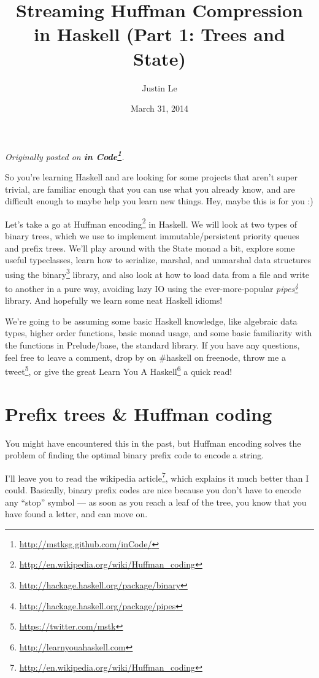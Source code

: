 \documentclass[]{article}
\title{Streaming Huffman Compression in Haskell (Part 1: Trees and State)}
\author{Justin Le}
\date{March 31, 2014}
\renewcommand{\href}[2]{#2\footnote{\url{#1}}}
\begin{document}
\maketitle

\emph{Originally posted on
\textbf{\href{http://mstksg.github.com/inCode/}{in Code}}.}

So you're learning Haskell and are looking for some projects that aren't
super trivial, are familiar enough that you can use what you already
know, and are difficult enough to maybe help you learn new things. Hey,
maybe this is for you :)

Let's take a go at
\href{http://en.wikipedia.org/wiki/Huffman_coding}{Huffman encoding} in
Haskell. We will look at two types of binary trees, which we use to
implement immutable/persistent priority queues and prefix trees. We'll
play around with the State monad a bit, explore some useful typeclasses,
learn how to serialize, marshal, and unmarshal data structures using the
\href{http://hackage.haskell.org/package/binary}{binary} library, and
also look at how to load data from a file and write to another in a pure
way, avoiding lazy IO using the ever-more-popular
\emph{\href{http://hackage.haskell.org/package/pipes}{pipes}} library.
And hopefully we learn some neat Haskell idioms!

We're going to be assuming some basic Haskell knowledge, like algebraic
data types, higher order functions, basic monad usage, and some basic
familiarity with the functions in Prelude/base, the standard library. If
you have any questions, feel free to leave a comment, drop by on
\#haskell on freenode, throw me a
\href{https://twitter.com/mstk}{tweet}, or give the great
\href{http://learnyouahaskell.com}{Learn You A Haskell} a quick read!

\section{Prefix trees \& Huffman
coding}\label{prefix-trees-huffman-coding}

You might have encountered this in the past, but Huffman encoding solves
the problem of finding the optimal binary prefix code to encode a
string.

I'll leave you to read
\href{http://en.wikipedia.org/wiki/Huffman_coding}{the wikipedia
article}, which explains it much better than I could. Basically, binary
prefix codes are nice because you don't have to encode any ``stop''
symbol --- as soon as you reach a leaf of the tree, you know that you
have found a letter, and can move on.
\end{document}
